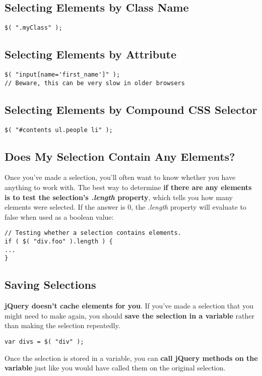 \documentclass[10pt,letterpaper]{report}
\begin{document}
\subsection{Selecting Elements by Class Name}
\begin{lstlisting}
$( ".myClass" );
\end{lstlisting}
\subsection{Selecting Elements by Attribute}
\begin{lstlisting}
$( "input[name='first_name']" );
// Beware, this can be very slow in older browsers
\end{lstlisting}
\subsection{Selecting Elements by Compound CSS Selector}
\begin{lstlisting}
$( "#contents ul.people li" );
\end{lstlisting}
\subsection{Does My Selection Contain Any Elements?}
Once you've made a selection, you'll often want to know whether you have anything to work with.
The best way to determine \textbf{if there are any elements is to test the selection's \textit{.length} property}, which tells you how many elements were selected. If the answer is 0, the \textit{.length} property will evaluate to false when used as a boolean value:
\begin{lstlisting}
// Testing whether a selection contains elements.
if ( $( "div.foo" ).length ) {
...
}
\end{lstlisting}
\subsection{Saving Selections}
\textbf{jQuery doesn't cache elements for you}. If you've made a selection that you might need to make again, you should \textbf{save the selection in a variable} rather than making the selection repeatedly.
\begin{lstlisting}
var divs = $( "div" );
\end{lstlisting}
Once the selection is stored in a variable, you can \textbf{call jQuery methods on the variable} just like you would have called them on the original selection.
\end{document}
